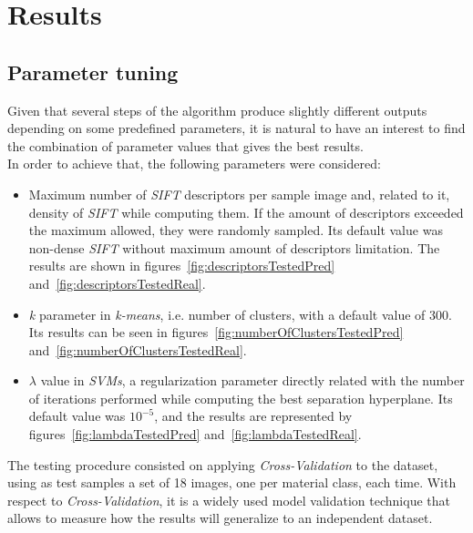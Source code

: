 
\section{Results} \label{sec:results}

\subsection{Parameter tuning}

Given that several steps of the algorithm produce slightly different outputs depending on some predefined parameters, it is natural to have an interest to find the combination of parameter values that gives the best results. \\

In order to achieve that, the following parameters were considered:

\begin{itemize}
    \item Maximum number of \emph{SIFT} descriptors per sample image and, related to it, density of \emph{SIFT} while computing them. If the amount of descriptors exceeded the maximum allowed, they were randomly sampled. Its default value was non-dense \emph{SIFT} without maximum amount of descriptors limitation. The results are shown in figures~\ref{fig:descriptorsTestedPred} and~\ref{fig:descriptorsTestedReal}.
    \item \emph{k} parameter in \emph{k-means}, i.e. number of clusters, with a default value of 300. Its results can be seen in figures~\ref{fig:numberOfClustersTestedPred} and~\ref{fig:numberOfClustersTestedReal}.
    \item $\lambda$ value in \emph{SVMs}, a regularization parameter directly related with the number of iterations performed while computing the best separation hyperplane. Its default value was $10^{-5}$, and the results are represented by figures~\ref{fig:lambdaTestedPred} and~\ref{fig:lambdaTestedReal}.
\end{itemize}

The testing procedure consisted on applying \emph{Cross-Validation} to the dataset, using as test samples a set of 18 images, one per material class, each time. With respect to \emph{Cross-Validation}, it is a widely used model validation technique that allows to measure how the results will generalize to an independent dataset. \\

